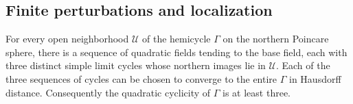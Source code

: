 \subsection{Finite perturbations and localization}

\begin{theorem}\label{rw:three-simple-cycles}
For every open neighborhood $\mathscr U$ of the hemicycle $\Gamma$
on the northern Poincare sphere, there is a sequence of quadratic
fields tending to the base field, each with three distinct simple
limit cycles whose northern images lie in $\mathscr U$.
Each of the three sequences of cycles can be chosen to converge to
the entire $\Gamma$ in Hausdorff distance.
Consequently the quadratic cyclicity of $\Gamma$ is at least three.
\end{theorem}

